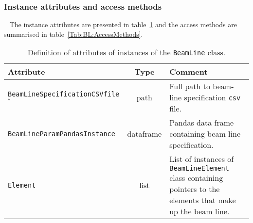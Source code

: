\subsubsection{Instance attributes and access methods} ~\newline
\label{SubSubSect:BL:InstAttr}
\noindent
The instance attributes are presented in table~\ref{Tab:BL:Attributes}
and the access methods are summarised in table~\ref{Tab:BL:AccessMethods}.
\begin{table}[h]
  \caption{
    Definition of attributes of instances of
    the \texttt{BeamLine} class.
  }
  \label{Tab:BL:Attributes}
  \begin{center}
    \begin{tabular}{|l|c|p{8.5cm}|}
      \hline
      \textbf{Attribute} & \textbf{Type} & \textbf{Comment}                                                                  \\
      \hline
      \texttt{BeamLineSpecificationCSVfile}$^*$ & path      & Full path to beam-line specification \texttt{csv} file.        \\
      \texttt{BeamLineParamPandasInstance}      & dataframe & Pandas data frame containing beam-line specification.          \\
      \texttt{Element}                          & list      & List of instances of \texttt{BeamLineElement} class containing
                                                              pointers to the elements that make up the beam line.           \\
      \hline
    \end{tabular}
  \end{center}
\end{table}
